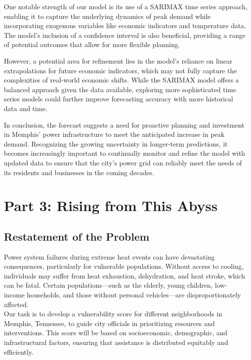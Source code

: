 \documentclass[12pt]{article}
\begin{document}
One notable strength of our model is its use of a SARIMAX time series approach, enabling it to capture the underlying dynamics of peak demand while incorporating exogenous variables like economic indicators and temperature data. The model's inclusion of a confidence interval is also beneficial, providing a range of potential outcomes that allow for more flexible planning.

However, a potential area for refinement lies in the model's reliance on linear extrapolations for future economic indicators, which may not fully capture the complexities of real-world economic shifts. While the SARIMAX model offers a balanced approach given the data available, exploring more sophisticated time series models could further improve forecasting accuracy with more historical data and time.

In conclusion, the forecast suggests a need for proactive planning and investment in Memphis' power infrastructure to meet the anticipated increase in peak demand. Recognizing the growing uncertainty in longer-term predictions, it becomes increasingly important to continually monitor and refine the model with updated data to ensure that the city's power grid can reliably meet the needs of its residents and businesses in the coming decades.



\section{Part 3: Rising from This Abyss }

\subsection{Restatement of the Problem}

Power system failures during extreme heat events can have devastating consequences, particularly for vulnerable populations. Without access to cooling, individuals may suffer from heat exhaustion, dehydration, and heat stroke, which can be fatal. Certain populations—such as the elderly, young children, low-income households, and those without personal vehicles—are disproportionately affected.\\
Our task is to develop a vulnerability score for different neighborhoods in Memphis, Tennessee, to guide city officials in prioritizing resources and interventions. This score will be based on socioeconomic, demographic, and infrastructural factors, ensuring that assistance is distributed equitably and efficiently.
\end{document}
